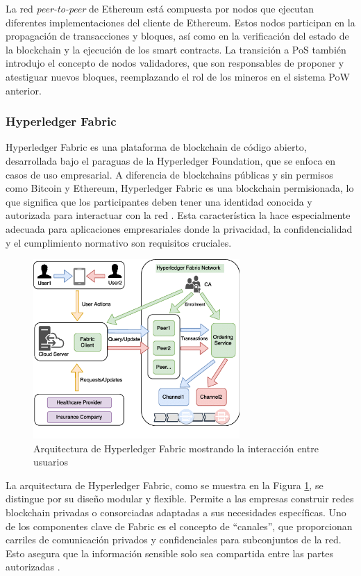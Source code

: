 La red \textit{peer-to-peer} de Ethereum está compuesta por nodos que ejecutan diferentes implementaciones del cliente de Ethereum. Estos nodos participan en la propagación de transacciones y bloques, así como en la verificación del estado de la blockchain y la ejecución de los smart contracts. La transición a PoS también introdujo el concepto de nodos validadores, que son responsables de proponer y atestiguar nuevos bloques, reemplazando el rol de los mineros en el sistema PoW anterior.

\subsubsection{Hyperledger Fabric}
Hyperledger Fabric es una plataforma de blockchain de código abierto, desarrollada bajo el paraguas de la Hyperledger Foundation, que se enfoca en casos de uso empresarial. A diferencia de blockchains públicas y sin permisos como Bitcoin y Ethereum, Hyperledger Fabric es una blockchain permisionada, lo que significa que los participantes deben tener una identidad conocida y autorizada para interactuar con la red \cite{HyperledgerFabric}. Esta característica la hace especialmente adecuada para aplicaciones empresariales donde la privacidad, la confidencialidad y el cumplimiento normativo son requisitos cruciales.

\begin{figure}[htb]
\centering
\includegraphics[width=0.7\textwidth]{figuras/hyperledger_fabric_architecture.png}
\caption{Arquitectura de Hyperledger Fabric mostrando la interacción entre usuarios \cite{RadwHyperledger2018}}
\label{figura:hyperledger_architecture}
\end{figure}

La arquitectura de Hyperledger Fabric, como se muestra en la Figura \ref{figura:hyperledger_architecture}, se distingue por su diseño modular y flexible. Permite a las empresas construir redes blockchain privadas o consorciadas adaptadas a sus necesidades específicas. Uno de los componentes clave de Fabric es el concepto de “canales”, que proporcionan carriles de comunicación privados y confidenciales para subconjuntos de la red. Esto asegura que la información sensible solo sea compartida entre las partes autorizadas \cite{Androulaki2018}.

